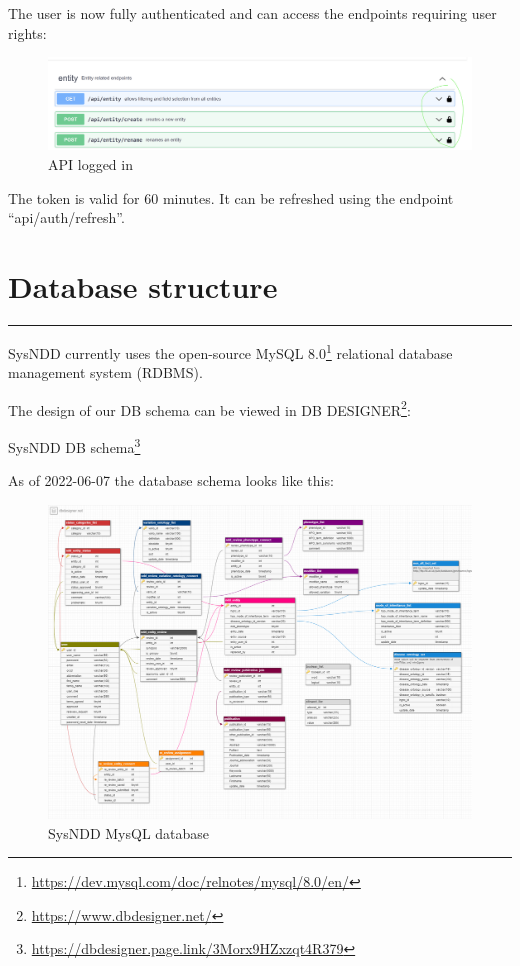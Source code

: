 \documentclass[
]{article}
\renewcommand{\href}[2]{#2\footnote{\url{#1}}}
\begin{document}
The user is now fully authenticated and can access the endpoints requiring user rights:

\begin{figure}
\centering
\includegraphics{./static/img/03_06-api-authorize-d.png}
\caption{API logged in}
\end{figure}

The token is valid for 60 minutes. It can be refreshed using the endpoint ``api/auth/refresh''.

\hypertarget{database-structure}{%
\section{Database structure}\label{database-structure}}

\begin{center}\rule{0.5\linewidth}{0.5pt}\end{center}

SysNDD currently uses the open-source \href{https://dev.mysql.com/doc/relnotes/mysql/8.0/en/}{MySQL 8.0} relational database management system (RDBMS).

The design of our DB schema can be viewed in \href{https://www.dbdesigner.net/}{DB DESIGNER}:

\href{https://dbdesigner.page.link/3Morx9HZxzqt4R379}{SysNDD DB schema}

As of 2022-06-07 the database schema looks like this:

\begin{figure}
\centering
\includegraphics{./static/img/04_01-design-db-schema.png}
\caption{SysNDD MysQL database}
\end{figure}
\end{document}
